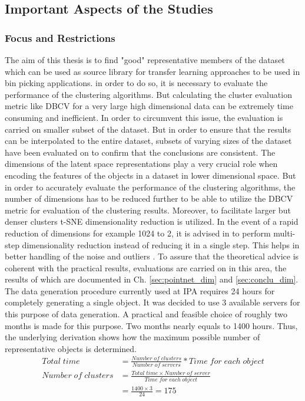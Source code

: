 \subsection{Important Aspects of the Studies}
\subsubsection{Focus and Restrictions}
\label{sec:restrictions}
The aim of this thesis is to find "good" representative members of the dataset which can be used as source library for transfer learning approaches to be used in bin picking applications. in order to do so, it is necessary to evaluate the performance of the clustering algorithms. But calculating the cluster evaluation metric like \ac{DBCV} for a very large high dimensional data can be extremely time consuming and inefficient. In order to circumvent this issue, the evaluation is carried on smaller subset of the dataset. But in order to ensure that the results can be interpolated to the entire dataset, subsets of varying sizes of the dataset have been evaluated on to confirm that the conclusions are consistent. The dimensions of the latent space representations play a very crucial role when encoding the features of the objects in a dataset in lower dimensional space. But in order to accurately evaluate the performance of the clustering algorithms, the number of dimensions has to be reduced further to be able to utilize the \ac{DBCV} metric for evaluation of the clustering results. Moreover, to facilitate larger but denser clusters \ac{t-SNE} dimensionality reduction is utilized. In the event of a rapid reduction of dimensions for example 1024 to 2, it is advised in \cite{tsne_sklearn} to perform multi-step dimensionality reduction instead of reducing it in a single step. This helps in better handling of the noise and outliers \cite{scikit-learn}. To assure that the theoretical advice is coherent with the practical results, evaluations are carried on in this area, the results of which are documented in Ch. \ref{sec:pointnet_dim} and \ref{sec:conclu_dim}. The data generation procedure currently used at \ac{IPA} requires 24 hours for completely generating a single object. It was decided to use 3 available servers for this purpose of data generation. A practical and feasible choice of roughly two months is made for this purpose. Two months nearly equals to 1400 hours. Thus, the underlying derivation shows how the maximum possible number of representative objects is determined.
\begin{equation}
    \label{eq:time_calc}
    \begin{split}
        Total \; time &= \frac{Number \; of \; clusters}{Number \; of \; servers} * Time \; for \; each \; object\\
        Number \; of \; clusters &= \frac{Total \; time \times Number \; of \; server}{Time \; for \; each \; object}
        \\
        &= \frac{1400 \times 3}{24} = 175
    \end{split}    
\end{equation}

